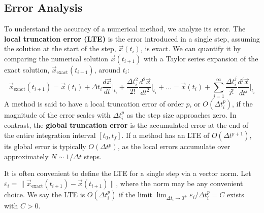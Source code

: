 \subsection{Error Analysis}
\label{subsec:ivp-error-analysis}
To understand the accuracy of a numerical method, we analyze its error. The \textbf{local truncation error (LTE)} is the error introduced in a single step, assuming the solution at the start of the step, $\vec{x}(t_i)$, is exact. We can quantify it by comparing the numerical solution $\vec{x}(t_{i+1})$ with a Taylor series expansion of the exact solution, $\vec{x}_{\text{exact}}(t_{i+1})$, around $t_i$:
\begin{equation}
    \vec{x}_{\text{exact}}(t_{i+1}) = \vec{x}(t_i) + \Delta t_i \frac{d\vec{x}}{dt}\bigg|_{t_i} + \frac{\Delta t_i^2}{2!} \frac{d^2\vec{x}}{dt^2}\bigg|_{t_i} + \dots = \vec{x}(t_i) + \sum_{j=1}^{\infty} \frac{\Delta t_i^j}{j!} \frac{d^j\vec{x}}{dt^j}\bigg|_{t_i}
    \label{eq:taylor_expansion}
\end{equation}
A method is said to have a local truncation error of order $p$, or $O(\Delta t_i^p)$, if the magnitude of the error scales with $\Delta t_i^p$ as the step size approaches zero. In contrast, the \textbf{global truncation error} is the accumulated error at the end of the entire integration interval $[t_0, t_f]$. If a method has an LTE of $O(\Delta t^{p+1})$, its global error is typically $O(\Delta t^p)$, as the local errors accumulate over approximately $N \sim 1/\Delta t$ steps.

It is often convenient to define the LTE for a single step via a vector norm. Let $\varepsilon_i = \big\|\vec{x}_{\text{exact}}(t_{i+1}) - \vec{x}(t_{i+1})\big\|$, where the norm may be any convenient choice. We say the LTE is $O(\Delta t_i^{p})$ if the limit $\lim_{\Delta t_i\to 0^+} \varepsilon_i/\Delta t_i^p = C$ exists with $C>0$.


